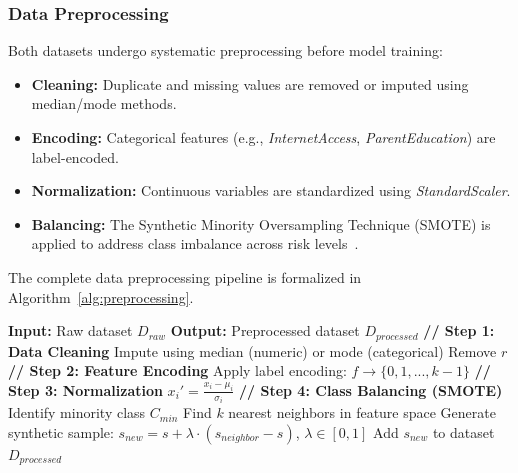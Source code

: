 \documentclass[conference]{IEEEtran}
\begin{document}
\subsubsection{Data Preprocessing}
Both datasets undergo systematic preprocessing before model training:
\begin{itemize}
    \item \textbf{Cleaning:} Duplicate and missing values are removed or imputed using median/mode methods.
    \item \textbf{Encoding:} Categorical features (e.g., \textit{InternetAccess}, \textit{ParentEducation}) are label-encoded.
    \item \textbf{Normalization:} Continuous variables are standardized using \textit{StandardScaler}.
    \item \textbf{Balancing:} The Synthetic Minority Oversampling Technique (SMOTE) is applied to address class imbalance across risk levels~\cite{ref40}.
\end{itemize}

The complete data preprocessing pipeline is formalized in Algorithm~\ref{alg:preprocessing}.

\begin{table}[H]
\centering
\begin{minipage}{0.48\textwidth}
\begin{algorithmic}[1]
\STATE \textbf{Input:} Raw dataset $D_{raw}$
\STATE \textbf{Output:} Preprocessed dataset $D_{processed}$
\STATE
\STATE \textbf{// Step 1: Data Cleaning}
        \STATE Impute using median (numeric) or mode (categorical)
    \ENDIF
        \STATE Remove $r$
    \ENDIF
\ENDFOR
\STATE
\STATE \textbf{// Step 2: Feature Encoding}
    \STATE Apply label encoding: $f \rightarrow \{0, 1, ..., k-1\}$
\ENDFOR
\STATE
\STATE \textbf{// Step 3: Normalization}
    \STATE $x_i' = \frac{x_i - \mu_i}{\sigma_i}$ 
\ENDFOR
\STATE
\STATE \textbf{// Step 4: Class Balancing (SMOTE)}
\STATE Identify minority class $C_{min}$
    \STATE Find $k$ nearest neighbors in feature space
    \STATE Generate synthetic sample:
    \STATE $s_{new} = s + \lambda \cdot (s_{neighbor} - s)$, $\lambda \in [0,1]$
    \STATE Add $s_{new}$ to dataset
\ENDFOR
\STATE
\RETURN $D_{processed}$
\end{algorithmic}
\label{alg:preprocessing}
\end{minipage}
\end{table}
\end{document}

